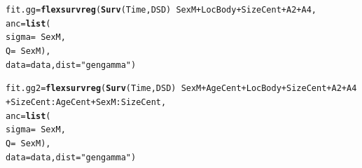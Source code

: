 \documentclass{article}\usepackage[]{graphicx}\usepackage[]{color}
\makeatletter
\newcommand{\hlstr}[1]{\textcolor[rgb]{0.192,0.494,0.8}{#1}}%
\newcommand{\hlopt}[1]{\textcolor[rgb]{0,0,0}{#1}}%
\newcommand{\hlstd}[1]{\textcolor[rgb]{0.345,0.345,0.345}{#1}}%
\newcommand{\hlkwb}[1]{\textcolor[rgb]{0.69,0.353,0.396}{#1}}%
\newcommand{\hlkwc}[1]{\textcolor[rgb]{0.333,0.667,0.333}{#1}}%
\newcommand{\hlkwd}[1]{\textcolor[rgb]{0.737,0.353,0.396}{\textbf{#1}}}%
\newenvironment{kframe}{%
 \def\at@end@of@kframe{}%
 \ifinner\ifhmode%
  \def\at@end@of@kframe{\end{minipage}}%
  \begin{minipage}{\columnwidth}%
 \fi\fi%
 \def\FrameCommand##1{\hskip\@totalleftmargin \hskip-\fboxsep
 \colorbox{shadecolor}{##1}\hskip-\fboxsep
     \hskip-\linewidth \hskip-\@totalleftmargin \hskip\columnwidth}%
 \MakeFramed {\advance\hsize-\width
   \@totalleftmargin\z@ \linewidth\hsize
   \@setminipage}}%
 {\par\unskip\endMakeFramed%
 \at@end@of@kframe}
\newenvironment{knitrout}{}{} %
\makeatother
\begin{document}
\begin{knitrout}
\color{fgcolor}\begin{kframe}
\begin{alltt}
\hlstd{fit.gg} \hlkwb{=} \hlkwd{flexsurvreg}\hlstd{(}\hlkwd{Surv}\hlstd{(Time, DSD)} \hlopt{~} \hlstd{SexM} \hlopt{+} \hlstd{LocBody} \hlopt{+} \hlstd{SizeCent} \hlopt{+} \hlstd{A2} \hlopt{+} \hlstd{A4,}
        \hlkwc{anc} \hlstd{=} \hlkwd{list}\hlstd{(}
                \hlkwc{sigma} \hlstd{=} \hlopt{~} \hlstd{SexM,}
                \hlkwc{Q} \hlstd{=} \hlopt{~} \hlstd{SexM),}
        \hlkwc{data} \hlstd{= data,} \hlkwc{dist} \hlstd{=} \hlstr{"gengamma"}\hlstd{)}

\hlstd{fit.gg2} \hlkwb{=} \hlkwd{flexsurvreg}\hlstd{(}\hlkwd{Surv}\hlstd{(Time, DSD)} \hlopt{~} \hlstd{SexM}\hlopt{+}\hlstd{AgeCent}\hlopt{+}\hlstd{LocBody}\hlopt{+}\hlstd{SizeCent}\hlopt{+}\hlstd{A2}\hlopt{+}\hlstd{A4}\hlopt{+}\hlstd{SizeCent}\hlopt{:}\hlstd{AgeCent}\hlopt{+}\hlstd{SexM}\hlopt{:}\hlstd{SizeCent,}
        \hlkwc{anc} \hlstd{=} \hlkwd{list}\hlstd{(}
                \hlkwc{sigma} \hlstd{=} \hlopt{~} \hlstd{SexM,}
                \hlkwc{Q} \hlstd{=} \hlopt{~} \hlstd{SexM),}
        \hlkwc{data} \hlstd{= data,} \hlkwc{dist} \hlstd{=} \hlstr{"gengamma"}\hlstd{)}


\end{alltt}
\end{kframe}
\end{knitrout}
\end{document}
